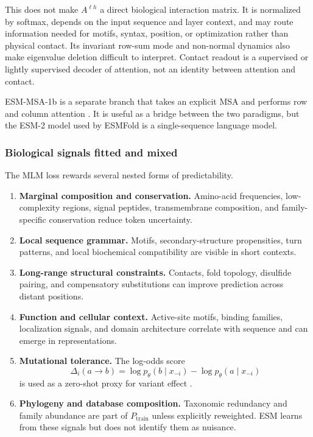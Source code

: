 \documentclass[10pt]{article}
\begin{document}
This does not make $A^{\ell h}$ a direct biological interaction matrix.  It is normalized by
softmax, depends on the input sequence and layer context, and may route information needed for
motifs, syntax, position, or optimization rather than physical contact.  Its invariant row-sum
mode and non-normal dynamics also make eigenvalue deletion difficult to interpret.  Contact
readout is a supervised or lightly supervised decoder of attention, not an identity between
attention and contact.

ESM-MSA-1b is a separate branch that takes an explicit MSA and performs row and column attention
\cite{rao2021}.  It is useful as a bridge between the two paradigms, but the ESM-2 model used by
ESMFold is a single-sequence language model.

\subsubsection{Biological signals fitted and mixed}

The MLM loss rewards several nested forms of predictability.
\begin{enumerate}
\setlength{\itemsep}{1pt}
\item \textbf{Marginal composition and conservation.}  Amino-acid frequencies, low-complexity
regions, signal peptides, transmembrane composition, and family-specific conservation reduce token
uncertainty.
\item \textbf{Local sequence grammar.}  Motifs, secondary-structure propensities, turn patterns,
and local biochemical compatibility are visible in short contexts.
\item \textbf{Long-range structural constraints.}  Contacts, fold topology, disulfide pairing,
and compensatory substitutions can improve prediction across distant positions.
\item \textbf{Function and cellular context.}  Active-site motifs, binding families, localization
signals, and domain architecture correlate with sequence and can emerge in representations.
\item \textbf{Mutational tolerance.}  The log-odds score
\begin{equation}
\Delta_i(a\to b)
=\log p_{\theta}(b\mid x_{-i})
-\log p_{\theta}(a\mid x_{-i})
\label{eq:esm-mutation-score}
\end{equation}
is used as a zero-shot proxy for variant effect \cite{meier2021}.
\item \textbf{Phylogeny and database composition.}  Taxonomic redundancy and family abundance are
part of $P_{\mathrm{train}}$ unless explicitly reweighted.  ESM learns from these signals but does
not identify them as nuisance.
\end{enumerate}
\end{document}
